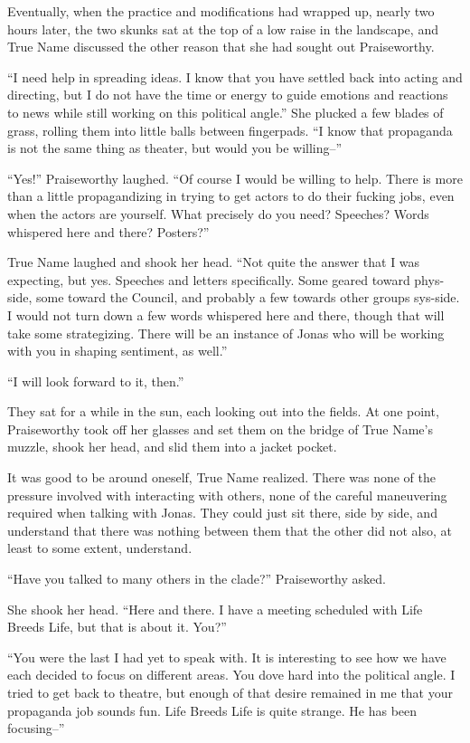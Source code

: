 Eventually, when the practice and modifications had wrapped up, nearly two hours later, the two skunks sat at the top of a low raise in the landscape, and True Name discussed the other reason that she had sought out Praiseworthy.

``I need help in spreading ideas. I know that you have settled back into acting and directing, but I do not have the time or energy to guide emotions and reactions to news while still working on this political angle.'' She plucked a few blades of grass, rolling them into little balls between fingerpads. ``I know that propaganda is not the same thing as theater, but would you be willing--''

``Yes!'' Praiseworthy laughed. ``Of course I would be willing to help. There is more than a little propagandizing in trying to get actors to do their fucking jobs, even when the actors are yourself. What precisely do you need? Speeches? Words whispered here and there? Posters?''

True Name laughed and shook her head. ``Not quite the answer that I was expecting, but yes. Speeches and letters specifically. Some geared toward phys-side, some toward the Council, and probably a few towards other groups sys-side. I would not turn down a few words whispered here and there, though that will take some strategizing. There will be an instance of Jonas who will be working with you in shaping sentiment, as well.''

``I will look forward to it, then.''

They sat for a while in the sun, each looking out into the fields. At one point, Praiseworthy took off her glasses and set them on the bridge of True Name's muzzle, shook her head, and slid them into a jacket pocket.

It was good to be around oneself, True Name realized. There was none of the pressure involved with interacting with others, none of the careful maneuvering required when talking with Jonas. They could just sit there, side by side, and understand that there was nothing between them that the other did not also, at least to some extent, understand.

``Have you talked to many others in the clade?'' Praiseworthy asked.

She shook her head. ``Here and there. I have a meeting scheduled with Life Breeds Life, but that is about it. You?''

``You were the last I had yet to speak with. It is interesting to see how we have each decided to focus on different areas. You dove hard into the political angle. I tried to get back to theatre, but enough of that desire remained in me that your propaganda job sounds fun. Life Breeds Life is quite strange. He has been focusing--''

